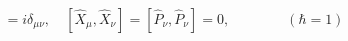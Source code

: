 \begin{equation}
 [\hat X_\mu,\hat P_\nu] = i\delta_{\mu\nu},\quad [\hat X_\mu,\hat X_\nu]
 = [\hat P_\nu, \hat P_\nu] = 0, \qquad\qquad (\hbar = 1)
\end{equation}

